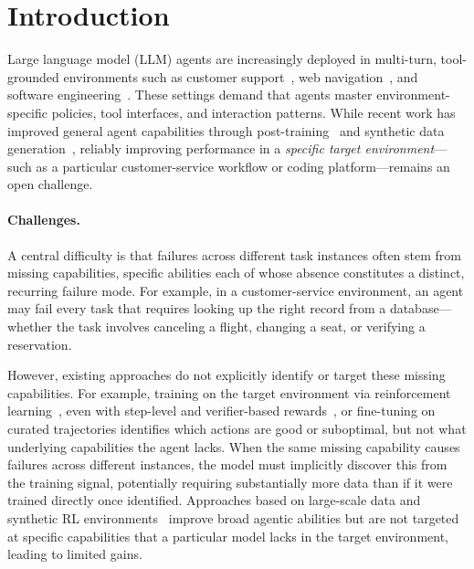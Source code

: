 
\section{Introduction}
Large language model (LLM) agents are increasingly deployed in multi-turn, tool-grounded environments such as customer support~\citep{yao2024taubenchbenchmarktoolagentuserinteraction}, web navigation~\citep{zhou2024webarenarealisticwebenvironment, drouin2024workarenacapablewebagents, lu2025toolsandboxstatefulconversationalinteractive}, and software engineering~\citep{jimenez2024swebenchlanguagemodelsresolve, xu2025theagentcompanybenchmarkingllmagents}. These settings demand that agents master environment-specific policies, tool interfaces, and interaction patterns. While recent work has improved general agent capabilities through post-training~\citep{bai2024digirltraininginthewilddevicecontrol, zhang2025agentrlscalingagenticreinforcement} and synthetic data generation~\citep{yang2025swesmith,sullivan2025procedural,gao2026selfevolving}, reliably improving performance in a \emph{specific target environment}---such as a particular customer-service workflow or coding platform---remains an open challenge.



\paragraph{Challenges.}
A central difficulty is that failures across different task instances often stem from missing capabilities, specific abilities each of whose absence constitutes a distinct, recurring failure mode. For example, in a customer-service environment, an agent may fail every task that requires looking up the right record from a database---whether the task involves canceling a flight, changing a seat, or verifying a reservation. 

However, existing approaches do not explicitly identify or target these missing capabilities. For example, training on the target environment via reinforcement learning~\citep{liu2025agenticreinforcementlearningimplicit}, even with step-level and verifier-based rewards~\citep{gao2026selfevolvingsyntheticdataverifiablereward}, or fine-tuning on curated trajectories identifies which actions are good or suboptimal, but not what underlying capabilities the agent lacks. When the same missing capability causes failures across different instances, the model must implicitly discover this from the training signal, potentially requiring substantially more data than if it were trained directly once identified. Approaches based on large-scale data and synthetic RL environments~\citep{sullivan2025proceduralenvironmentgenerationtooluse, wang2026agentworldmodel, fang2025generalagenticintelligenceenvironment, tu2026scaleenvscalingenvironmentsynthesis, song2026envscalerscalingtoolinteractiveenvironments} improve broad agentic abilities but are not targeted at specific capabilities that a particular model lacks in the target environment, leading to limited gains. 


